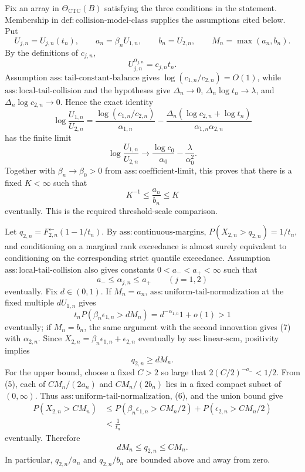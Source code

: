 Fix an array in \(\Theta_{\mathrm{CTC}}(B)\) satisfying the three conditions in the statement. Membership in \(\mathrm{def{:}collision\text{-}model\text{-}class}\) supplies the assumptions cited below. Put
\[
U_{j,n}=U_{j,n}(t_n),\qquad
a_n=\beta_nU_{1,n},\qquad b_n=U_{2,n},\qquad M_n=\max(a_n,b_n).
\tag{1}
\]
By the definitions of \(c_{j,n}\),
\[
U_{j,n}^{\alpha_{j,n}}=c_{j,n}t_n.
\tag{2}
\]
Assumption \(\mathrm{ass{:}tail\text{-}constant\text{-}balance}\) gives \(\log(c_{1,n}/c_{2,n})=O(1)\), while \(\mathrm{ass{:}local\text{-}tail\text{-}collision}\) and the hypotheses give \(\Delta_n\to0\), \(\Delta_n\log t_n\to\lambda\), and \(\Delta_n\log c_{2,n}\to0\). Hence the exact identity
\[
\log\frac{U_{1,n}}{U_{2,n}}
=\frac{\log(c_{1,n}/c_{2,n})}{\alpha_{1,n}}
-\frac{\Delta_n(\log c_{2,n}+\log t_n)}{\alpha_{1,n}\alpha_{2,n}}
\tag{3}
\]
has the finite limit
\[
\log\frac{U_{1,n}}{U_{2,n}}
\longrightarrow \frac{\log c_0}{\alpha_0}-\frac{\lambda}{\alpha_0^2}.
\tag{4}
\]
Together with \(\beta_n\to\beta_0>0\) from \(\mathrm{ass{:}coefficient\text{-}limit}\), this proves that there is a fixed \(K<\infty\) such that
\[
K^{-1}\leq\frac{a_n}{b_n}\leq K
\tag{5}
\]
eventually. This is the required threshold-scale comparison.

Let \(q_{2,n}=F_{2,n}^{\leftarrow}(1-1/t_n)\). By \(\mathrm{ass{:}continuous\text{-}margins}\), \(P(X_{2,n}>q_{2,n})=1/t_n\), and conditioning on a marginal rank exceedance is almost surely equivalent to conditioning on the corresponding strict quantile exceedance. Assumption \(\mathrm{ass{:}local\text{-}tail\text{-}collision}\) also gives constants \(0<a_-<a_+<\infty\) such that
\[
a_-\leq\alpha_{j,n}\leq a_+\qquad(j=1,2)
\tag{6}
\]
eventually. Fix \(d\in(0,1)\). If \(M_n=a_n\), \(\mathrm{ass{:}uniform\text{-}tail\text{-}normalization}\) at the fixed multiple \(dU_{1,n}\) gives
\[
t_nP(\beta_n\epsilon_{1,n}>dM_n)=d^{-\alpha_{1,n}}{1+o(1)}>1
\tag{7}
\]
eventually; if \(M_n=b_n\), the same argument with the second innovation gives (7) with \(\alpha_{2,n}\). Since \(X_{2,n}=\beta_n\epsilon_{1,n}+\epsilon_{2,n}\) eventually by \(\mathrm{ass{:}linear\text{-}scm}\), positivity implies
\[
q_{2,n}\geq dM_n.
\tag{8}
\]
For the upper bound, choose a fixed \(C>2\) so large that \(2(C/2)^{-a_-}<1/2\). From (5), each of \(CM_n/(2a_n)\) and \(CM_n/(2b_n)\) lies in a fixed compact subset of \((0,\infty)\). Thus \(\mathrm{ass{:}uniform\text{-}tail\text{-}normalization}\), (6), and the union bound give
\[
\begin{split}
P(X_{2,n}>CM_n)
&\leq P(\beta_n\epsilon_{1,n}>CM_n/2)
+P(\epsilon_{2,n}>CM_n/2)\\
&<\frac1{t_n}
\end{split}
\tag{9}
\]
eventually. Therefore
\[
dM_n\leq q_{2,n}\leq CM_n.
\tag{10}
\]
In particular, \(q_{2,n}/a_n\) and \(q_{2,n}/b_n\) are bounded above and away from zero.

